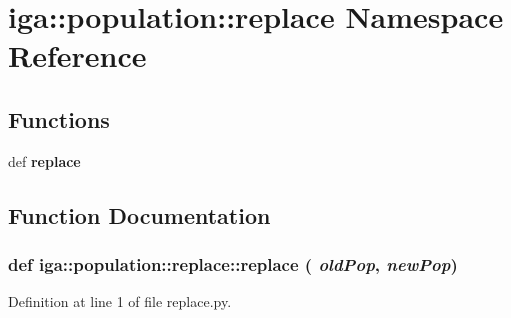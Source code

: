 \section{iga::population::replace Namespace Reference}
\label{namespaceiga_1_1population_1_1replace}


\subsection*{Functions}
\begin{CompactItemize}
\item 
def {\bf replace}
\end{CompactItemize}


\subsection{Function Documentation}
\subsubsection{\setlength{\rightskip}{0pt plus 5cm}def iga::population::replace::replace ( {\em oldPop},  {\em newPop})}\label{namespaceiga_1_1population_1_1replace_7119129914c3edae13b3dd492d691e39}




Definition at line 1 of file replace.py.